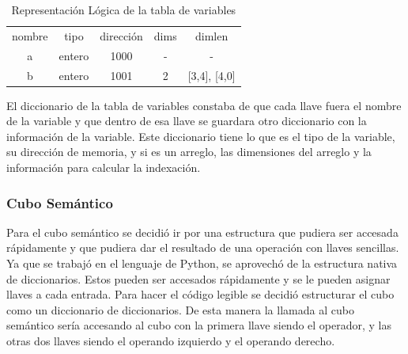 \begin{table}[htbp]
    \centering
    \begin{tabular}{c|c|c|c|c}
        nombre & tipo & dirección & dims & dimlen   \\
        a & entero & 1000 & - & - \\
        b & entero & 1001 & 2 & [3,4], [4,0] \\
    \end{tabular}
    \caption{Representación Lógica de la tabla de variables}
    \label{tab:my_label}
\end{table}
\FloatBarrier
El diccionario de la tabla de variables constaba de que cada llave fuera el nombre de la variable y que dentro de esa llave se guardara otro diccionario con la información de la variable. Este diccionario tiene lo que es el tipo de la variable, su dirección de memoria, y si es un arreglo, las dimensiones del arreglo y la información para calcular la indexación.

\subsubsection{Cubo Semántico}

Para el cubo semántico se decidió ir por una estructura que pudiera ser accesada rápidamente y que pudiera dar el resultado de una operación con llaves sencillas. Ya que se trabajó en el lenguaje de Python, se aprovechó de la estructura nativa de diccionarios. Estos pueden ser accesados rápidamente y se le pueden asignar llaves a cada entrada. Para hacer el código legible se decidió estructurar el cubo como un diccionario de diccionarios. De esta manera la llamada al cubo semántico sería accesando al cubo con la primera llave siendo el operador, y las otras dos llaves siendo el operando izquierdo y el operando derecho.


